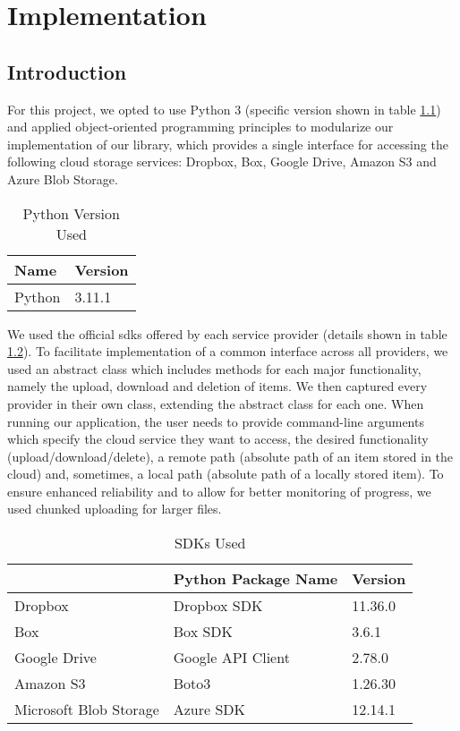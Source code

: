 \chapter{Implementation}

\section{Introduction}
For this project, we opted to use Python 3 (specific version shown in table \ref{tab:Python_Version}) and applied object-oriented programming principles to modularize our implementation of our library, which provides a single interface for accessing the following cloud storage services: Dropbox, Box, Google Drive, Amazon S3 and Azure Blob Storage. 


\begin{table}[!h]
	\centering
	\begin{tabular}{|l|l|}
		\hline
		\rowcolor[HTML]{EFEFEF} 
		\textbf{Name} & \textbf{Version} \\ \hline
		Python        & 3.11.1           \\ \hline
	\end{tabular}
	\caption{Python Version Used}
	\label{tab:Python_Version}
\end{table}

We used the official \ac{sdk}s offered by each service provider (details shown in table \ref{tab:SDKs}).  To facilitate implementation of a common interface across all providers, we used an abstract class which includes methods for each major functionality, namely the upload, download and deletion of items. We then captured every provider in their own class, extending the abstract class for each one. When running our application, the user needs to provide command-line arguments which specify the cloud service they want to access, the desired functionality (upload/download/delete), a remote path (absolute path of an item stored in the cloud) and, sometimes, a local path (absolute path of a locally stored item). To ensure enhanced reliability and to allow for better monitoring of progress, we used chunked uploading for larger files. 


\begin{table}[!h]
	\centering
	\begin{tabular}{|l|l|l|}
		\hline
		\rowcolor[HTML]{EFEFEF} 
		\multicolumn{1}{|c|}{\cellcolor[HTML]{EFEFEF}\textbf{Cloud Storage Service}} &
		\multicolumn{1}{c|}{\cellcolor[HTML]{EFEFEF}\textbf{Python Package Name}} &
		{\color[HTML]{333333} \textbf{Version}} \\ \hline
		Dropbox                & Dropbox SDK       & 11.36.0 \\ \hline
		Box                    & Box SDK           & 3.6.1   \\ \hline
		Google Drive           & Google API Client & 2.78.0  \\ \hline
		Amazon S3              & Boto3             & 1.26.30 \\ \hline
		Microsoft Blob Storage & Azure SDK         & 12.14.1 \\ \hline
	\end{tabular}
	\caption{SDKs Used}
	\label{tab:SDKs}
\end{table}


